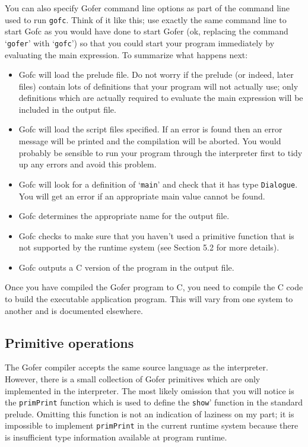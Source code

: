 You can also specify Gofer command line options as part of the command
line used to run \verb"gofc".  Think of it like this; use exactly the same
command line to start Gofc as you would have done to start Gofer (ok,
replacing the command `\verb"gofer"' with `\verb"gofc"') so that you could start your
program immediately by evaluating the main expression.  To summarize
what happens next:
\begin{itemize}
\item  Gofc will load the prelude file.  Do not worry if the prelude
     (or indeed, later files) contain lots of definitions that your
     program will not actually use; only definitions which are actually
     required to evaluate the main expression will be included in the
     output file.

\item  Gofc will load the script files specified.  If an error is found
     then an error message will be printed and the compilation will be
     aborted.  You would probably be sensible to run your program
     through the interpreter first to tidy up any errors and avoid this
     problem.

\item  Gofc will look for a definition of `\verb"main"' and check that it has
     type \verb"Dialogue".  You will get an error if an appropriate main
     value cannot be found.

\item  Gofc determines the appropriate name for the output file.

\item  Gofc checks to make sure that you haven't used a primitive
     function that is not supported by the runtime system (see
     Section 5.2 for more details).

\item  Gofc outputs a C version of the program in the output file.
\end{itemize}

Once you have compiled the Gofer program to C, you need to compile
the C code to build the executable application program.  This will
vary from one system to another and is documented elsewhere.


\subsection{Primitive operations}
The Gofer compiler accepts the same source language as the
interpreter.  However, there is a small collection of Gofer primitives
which are only implemented in the interpreter.  The most likely
omission that you will notice is the \verb"primPrint" function which is used
to define the \verb"show"' function in the standard prelude.  Omitting this
function is not an indication of laziness on my part; it is impossible
to implement \verb"primPrint" in the current runtime system because there is
insufficient type information available at program runtime.

